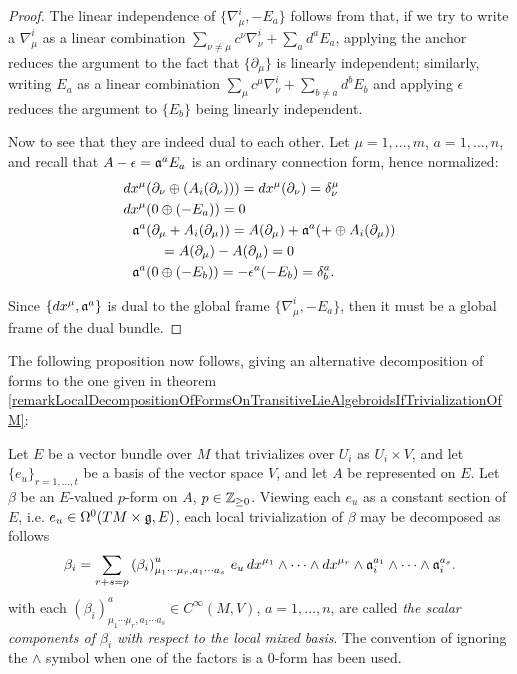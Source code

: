 \begin{proof}
The linear independence of $\{\nabla^i_\mu, -E_a\}$ follows from that, if we try to write a $\nabla^i_\mu$ as a linear combination $\sum_{\nu \neq \mu} c^\nu \nabla^i_\nu + \sum_a d^a E_a$, applying the anchor reduces the argument to the fact that $\{\partial_\mu\}$ is linearly independent; similarly, writing $E_a$ as a linear combination $\sum_{\mu} c^\mu \nabla^i_\nu + \sum_{b \neq a} d^b E_b$ and applying $\epsilon$ reduces the argument to $\{E_b\}$ being linearly independent.

Now to see that they are indeed dual to each other. Let $\mu = 1, \dots, m$, $a = 1, \dots, n$, and recall that $A - \epsilon = \alg a^a E_a$ is an ordinary connection form, hence normalized:
\begin{align*}
    dx^\mu&(\partial_\nu \oplus( A_i(\partial_\nu))) = dx^\mu(\partial_\nu) = \delta^\mu_\nu\\
    dx^\mu&(0 \oplus (-E_a)) = 0\\
    \alg a^a&(\partial_\mu + A_i(\partial_\mu)) = A(\partial_\mu) + \alg a^a(+\oplus A_i(\partial_\mu)) \\
    &\quad = A(\partial_\mu) - A(\partial_\mu) = 0\\
    \alg a^a&(0\oplus (-E_b)) = -\epsilon^a(-E_b) = \delta^a_b.
\end{align*}

Since $\{dx^\mu, \mathfrak{a}^a\}$ is dual to the global frame $\{\nabla^i_\mu, -E_a\}$, then it must be a global frame of the dual bundle.
\end{proof}

The following proposition now follows, giving an alternative decomposition of forms to the one given in theorem \ref{remarkLocalDecompositionOfFormsOnTransitiveLieAlgebroidsIfTrivializationOfM}:

\begin{proposition}\label{TheoremDecompOfVectorValuedFormsTLAMixedLocalBasisDxs}
Let $E$ be a vector bundle over $M$ that trivializes over $U_i$ as $U_i \times V$, and let $\{e_u\}_{r = 1, \dots, t}$ be a basis of the vector space $V$, and let $A$ be represented on $E$. Let $\beta$ be an $E$-valued $p$-form on $A$, $p \in \mathbb{Z}_{\geq 0}$. Viewing each $e_u$ as a constant section of $E$, i.e. $e_u \in \Omega^0(TM \times \mathfrak{g}, E)$, each local trivialization of $\beta$ may be decomposed as follows
\begin{equation}
    \beta_i = \sum_{r + s = p} \left(\beta_i \right)^u_{\mu_1 \cdots \mu_r, a_1 \cdots a_s}\, e_u \, dx^{\mu_1} \wedge \cdots \wedge dx^{\mu_r} \wedge \mathfrak{a}_i^{a_1} \wedge \cdots \wedge \mathfrak{a}_i^{a_s}.
\end{equation} 
with each $\left(\beta_i\right)^a_{\mu_1 \cdots \mu_r, a_1 \cdots a_s} \in C^\infty(M, V)$, $a = 1, \dots, n$, are called \emph{the scalar components of $\beta_i$ with respect to the local mixed basis}.
The convention of ignoring the $\wedge$ symbol when one of the factors is a $0$-form has been used.
\end{proposition}

